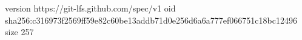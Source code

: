 version https://git-lfs.github.com/spec/v1
oid sha256:c316973f2569ff59e82c60be13addb71d0e256d6a6a777ef066751c18bc12496
size 257

